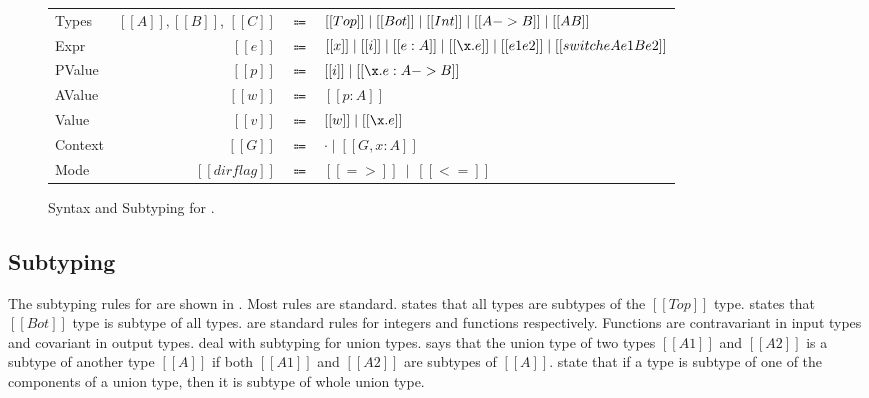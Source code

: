 \begin{figure}[t]
  \begin{small}
    \centering
    \begin{tabular}{lrcl} \toprule
      Types & $[[A]], [[B]]$, $[[C]]$ & $\Coloneqq$ & $ [[Top]] \mid [[Bot]] \mid [[Int]] \mid [[A -> B]] \mid [[A \/ B]] $ \\
      Expr & $[[e]]$ & $\Coloneqq$ & $[[x]] \mid [[i]] \mid [[e:A]] \mid [[\x.e]] \mid [[e1 e2]] \mid [[switch e A e1 B e2]]$\\
      PValue & $[[p]]$ & $\Coloneqq$ & $[[i]] \mid [[\x.e : A -> B]] $\\
      AValue & $[[w]]$ & $\Coloneqq$ & $[[p:A]]$\\
      Value & $[[v]]$ & $\Coloneqq$ & $[[w]] \mid [[\x.e]] $\\
      Context & $[[G]]$ & $\Coloneqq$ & $ \cdot \mid [[G , x : A]]$ \\
      Mode & $[[dirflag]]$ & $\Coloneqq$ & $[[=>]] \ \mid \ [[<=]]$ \\
      \bottomrule
    \end{tabular}
  \end{small}
  \begin{small}
    \centering
  \end{small}


  \caption{Syntax and Subtyping for \cal.}
  \label{fig:union:syntax}
\end{figure}

\subsection{Subtyping}
\label{sec:union:sub}
The subtyping rules for \cal are shown in
. Most rules are standard.
 states that all types are subtypes of
the $[[Top]]$ type.  states that $[[Bot]]$ type is subtype of
all types.  are standard rules for integers and
functions respectively.  Functions are contravariant in input types
and covariant in output types.  deal with
subtyping for union types.  says that the union type of two types $[[A1]]$ and $[[A2]]$
is a subtype of another type $[[A]]$ if both $[[A1]]$ and $[[A2]]$ are subtypes of
$[[A]]$.  state that if a
type is subtype of one of the components of a union type, then it is subtype of whole
union type.  

